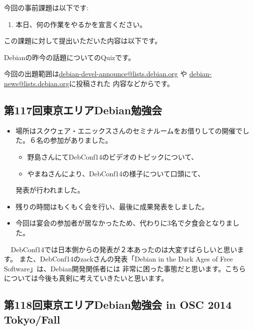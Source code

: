 \documentclass[mingoth,a4paper]{jsarticle}
\begin{document}

今回の事前課題は以下です:
\begin{enumerate}
 \item 本日、何の作業をやるかを宣言ください。
\end{enumerate}
この課題に対して提出いただいた内容は以下です。
\begin{multicols}{2}
{\small

}
\end{multicols}


 Debianの昨今の話題についてのQuizです。

今回の出題範囲は\url{debian-devel-announce@lists.debian.org} や \url{debian-news@lists.debian.org}に投稿された
内容などからです。

\begin{multicols}{2}

\end{multicols}


\subsection{第117回東京エリアDebian勉強会}

\begin{itemize}
\item 場所はスクウェア・エニックスさんのセミナルームをお借りしての開催でした。６名の参加がありました。
\begin{itemize}
\item 野島さんにてDebConf14のビデオのトピックについて、
\item やまねさんにより、DebConf14の様子について口頭にて、
\end{itemize}
発表が行われました。
\item 残りの時間はもくもく会を行い、最後に成果発表をしました。
\item 今回は宴会の参加者が居なかったため、代わりに3名で夕食会となりました。
\end{itemize} 

　DebConf14では日本側からの発表が２本あったのは大変すばらしいと思います。
また、DebConf14のzackさんの発表「Debian in the Dark Ages of Free Software」は、Debian開発関係者には
非常に困った事態だと思います。こちらについては今後も真剣に考えていきたいと思います。

\subsection{第118回東京エリアDebian勉強会 in OSC 2014 Tokyo/Fall}
\end{document}
